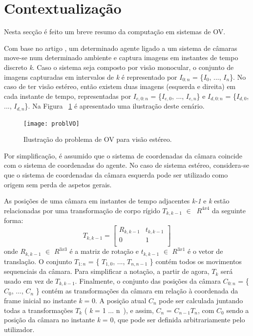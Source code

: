 \section{Contextualização}

Nesta secção é feito um breve resumo da computação em sistemas de OV.

Com base no artigo \cite{VOpart1}, um determinado agente ligado a um sistema de câmaras move-se num determinado ambiente e captura imagens em instantes de tempo discreto \textit{k}. Caso o sistema seja composto por visão monocular, o conjunto de imagens capturadas em intervalos de \textit{k} é representado por  \textit{$I_{0:n}$}  = \{\textit{$I_0$}, ..., \textit{$I_n$}\}. 
No caso de ter visão estéreo, então existem duas imagens (esquerda e direita) em cada instante de tempo, representadas por \textit{$I_{e,0:n}$} = \{\textit{$I_{e,0}$}, ..., \textit{$I_{e,n}$}\} e \textit{$I_{d,0:n}$} = \{\textit{$I_{d,0}$}, ..., \textit{$I_{d,n}$}\}. 
Na Figura ~\ref{fig:arch} é apresentado uma ilustração deste cenário. 


\begin{figure}[h!] %
	\begin{center}
		\leavevmode		
		\texttt{[image: problVO]}
		\caption{Ilustração do problema de OV para visão estéreo.  \cite{VOpart1}}
		\label{fig:arch}
	\end{center}
\end{figure}

Por simplificação, é assumido que o sistema de coordenadas da câmara coincide com o sistema de coordenadas do agente. No caso de sistema estéreo, considera-se que o sistema de coordenadas da câmara esquerda pode ser utilizado como origem sem perda de aspetos gerais.

As posições de uma câmara em instantes de tempo adjacentes \textit{k-1} e \textit{k} estão relacionadas por uma transformação de corpo rígido $T_{k,k-1}$ $\in\ $ $R^{4x4}$ da seguinte forma: \[ T_{k,k-1} = \left[\begin{array}{cc} R_{k,k-1} & t_{k,k-1} \\  0 & 1 \\ \end{array} \right] \]
onde $R_{k,k-1}$ $\in$ $R^{3x3}$ é a matriz de rotação e $t_{k,k-1}$ $\in$ $R^{3x1}$ é o vetor de translação. O conjunto $T_{1:n}$ = \{ $T_{1,0}$, ..., $T_{n,n-1}$ \} contém todos os movimentos sequenciais da câmara. Para simplificar
a notação, a partir de agora, $T_k$ será usado em vez de $T_{k,k-1}$. Finalmente, o conjunto das posições da câmara $C_{0:n}$ = \{ $C_0$, ..., $C_n$ \} contém as transformações da câmara em relação à coordenada da frame inicial no instante \textit{k} = 0. A posição atual $C_n$ pode ser calculada juntando todas a transformações $T_k$ ( \textit{k} = 1 ... n\ ), e assim, $C_n$ = $C_{n-1}T_n$, com $C_0$ sendo a posição da câmara no instante \textit{k} = 0, que pode ser definida arbitrariamente pelo utilizador.


